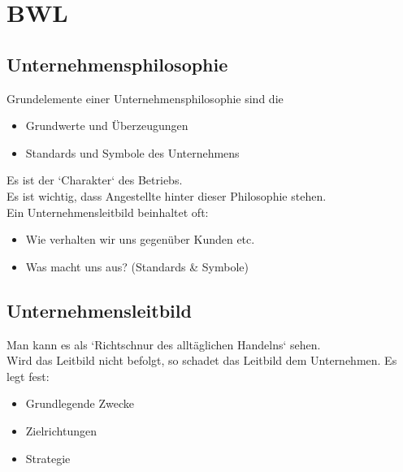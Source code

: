 \documentclass[asp1.tex]{subfiles}
\begin{document}
\section{BWL}
\subsection{Unternehmensphilosophie}
Grundelemente einer Unternehmensphilosophie sind die
\begin{itemize}
    \item Grundwerte und Überzeugungen
    \item Standards und Symbole des  Unternehmens
\end{itemize}
Es ist der `Charakter` des  Betriebs. \\
Es ist  wichtig, dass Angestellte hinter dieser Philosophie stehen. \\
Ein Unternehmensleitbild beinhaltet oft:
\begin{itemize}
    \item Wie verhalten wir uns gegenüber Kunden etc.
    \item Was macht uns aus? (Standards \& Symbole)
\end{itemize}

\subsection{Unternehmensleitbild}
Man kann es als `Richtschnur des alltäglichen Handelns` sehen. \\
Wird das Leitbild nicht befolgt, so schadet das Leitbild dem Unternehmen.
Es legt fest:
\begin{itemize}
    \item Grundlegende Zwecke
    \item Zielrichtungen
    \item Strategie
\end{itemize}

\break
\end{document}
